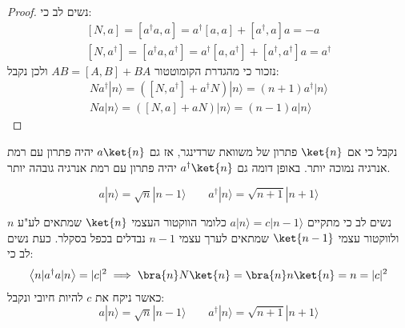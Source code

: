 \documentclass{tstextbook}
\begin{document}
\begin{proof}
נשים לב כי:
$$\begin{gather}\left[N,a\right]=\left[a^{\dagger}a,a\right]=a^{\dagger}\left[a,a\right]+\left[a^{\dagger},a\right]a=-a  \\\left[ N,a^{\dagger} \right]=\left[ a^{\dagger}a,a^{\dagger} \right]=a^{\dagger}\left[ a,a^{\dagger} \right]+\left[ a^{\dagger},a^{\dagger} \right]a = a^{\dagger}
\end{gather}$$
נזכור כי מהגדרת הקומוטטור \(AB=[A,B]+BA\) ולכן נקבל:
$$\begin{gather}N a^{\dagger}|n\rangle=\left( \left[ N,a^{\dagger} \right]+a^{\dagger}N \right)|n\rangle=(n+1)a^{\dagger}|n\rangle  \\N a|n\rangle=([N,a]+a N)|n\rangle=(n-1)a|n\rangle
\end{gather}$$

\end{proof}
\begin{remark}
נקבל כי אם \(\ket{n}\) פתרון של משוואת שרדינגר, אז גם \(a\ket{n}\) יהיה פתרון עם רמת אנרגיה נמוכה יותר. באופן דומה גם \(a^{\dagger}\ket{n}\) יהיה פתרון עם רמת אנרגיה גובהה יותר.

\end{remark}
\begin{proposition}
$$a|n\rangle=\sqrt{n}|n-1\rangle \qquad  a^{\dagger}|n\rangle=\sqrt{n+1}|n+1\rangle$$

\end{proposition}
נשים לב כי מתקיים \(a|n\rangle=c|n-1\rangle\) כלומר הווקטור העצמי \(\ket{n}\) שמתאים לע"ע \(n\) ולווקטור עצמי \(\ket{n-1}\) שמתאים לערך עצמי \(n-1\) נבדלים בכפל בסקלר. כעת נשים לב כי:
$$\left\langle  n|a^{\dagger}a|n \right\rangle=|c|^{2}\implies \bra{n} N\ket{n} =\bra{n} n\ket{n} =n=\lvert c \rvert ^2$$
כאשר ניקח את \(c\) להיות חיובי ונקבל:
$$a|n\rangle=\sqrt{n}|n-1\rangle \qquad  a^{\dagger}|n\rangle=\sqrt{n+1}|n+1\rangle$$
\end{document}
